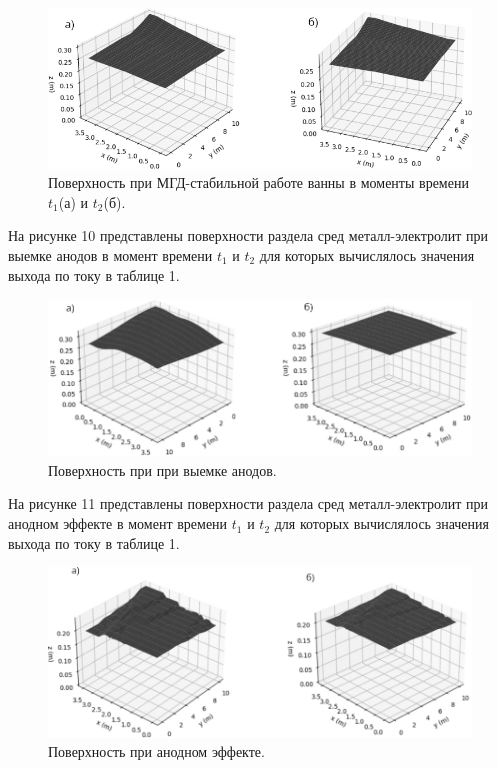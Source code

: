 \documentclass{article}
\begin{document}
\begin{figure}[H]
    \centering
    \includegraphics[width=150mm]{спокойная поверхность.png}
    \caption{Поверхность при МГД-стабильной работе ванны в моменты времени $t_1$(а) и $t_2$(б).}
    \label{fig:stab} 
\end{figure}

На рисунке 10 представлены поверхности раздела сред металл-электролит при выемке анодов в момент времени $t_1$ и $t_2$ для которых вычислялось значения выхода по току в таблице 1.

\begin{figure}[H]
    \centering
    \includegraphics[width=150mm]{Выемка анодов поверхность.png}
    \caption{Поверхность при при выемке анодов.}
    \label{fig:viemkaanod} 
\end{figure}

На рисунке 11 представлены поверхности раздела сред металл-электролит при анодном эффекте в момент времени $t_1$ и $t_2$ для которых вычислялось значения выхода по току в таблице 1.

\begin{figure}[H]
    \centering
    \includegraphics[width=150mm]{Анодный эффект поверхность.png}
    \caption{Поверхность при анодном эффекте.}
    \label{fig:anodeffect}
\end{figure}
\end{document}
